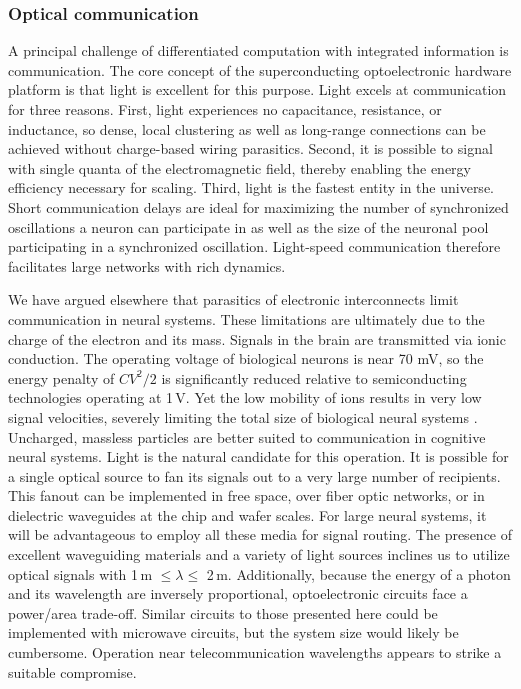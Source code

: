 \documentclass[twocolumn]{article}
\begin{document}
\subsubsection{Optical communication}
A principal challenge of differentiated computation with integrated information is communication. The core concept of the superconducting optoelectronic hardware platform is that light is excellent for this purpose. Light excels at communication for three reasons. First, light experiences no capacitance, resistance, or inductance, so dense, local clustering as well as long-range connections can be achieved without charge-based wiring parasitics. Second, it is possible to signal with single quanta of the electromagnetic field, thereby enabling the energy efficiency necessary for scaling. Third, light is the fastest entity in the universe. Short communication delays are ideal for maximizing the number of synchronized oscillations a neuron can participate in as well as the size of the neuronal pool participating in a synchronized oscillation. Light-speed communication therefore facilitates large networks with rich dynamics.

We have argued elsewhere \cite{shbu2017} that parasitics of electronic interconnects limit communication in neural systems. These limitations are ultimately due to the charge of the electron and its mass. Signals in the brain are transmitted via ionic conduction. The operating voltage of biological neurons is near 70 mV, so the energy penalty of $C V^2/2$ is significantly reduced relative to semiconducting technologies operating at 1\,V. Yet the low mobility of ions results in very low signal velocities, severely limiting the total size of biological neural systems \cite{bu2006}. Uncharged, massless particles are better suited to communication in cognitive neural systems. Light is the natural candidate for this operation. It is possible for a single optical source to fan its signals out to a very large number of recipients. This fanout can be implemented in free space, over fiber optic networks, or in dielectric waveguides at the chip and wafer scales. For large neural systems, it will be advantageous to employ all these media for signal routing. The presence of excellent waveguiding materials and a variety of light sources inclines us to utilize optical signals with 1\,\textmu m $\le \lambda \le$ 2\,\textmu m. Additionally, because the energy of a photon and its wavelength are inversely proportional, optoelectronic circuits face a power/area trade-off. Similar circuits to those presented here could be implemented with microwave circuits, but the system size would likely be cumbersome. Operation near telecommunication wavelengths appears to strike a suitable compromise. 
\end{document}
